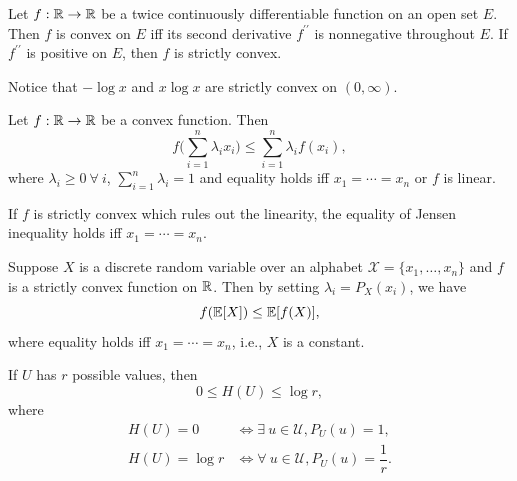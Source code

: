 \documentclass[11pt,a4paper]{article}
\begin{document}
\begin{lemma}
    Let $f:\mathbb{R}\rightarrow \mathbb{R}$ be a twice continuously differentiable function on an open set $E$. Then $f$ is convex on $E$ iff its second derivative $f^{\prime\prime}$ is nonnegative throughout $E$. If $f^{\prime\prime}$ is positive on $E$, then $f$ is strictly convex.
\end{lemma}

\begin{remark}
    Notice that $-\log x$ and $x\log x$ are strictly convex on $(0,\infty)$.
\end{remark}

\begin{lemma}
    Let $f:\mathbb{R}\rightarrow \mathbb{R}$ be a convex function. Then 
    \begin{equation*}
        f\Big(\sum_{i=1}^n\lambda_i x_i\Big)\le \sum_{i=1}^n\lambda_i f(x_i),
    \end{equation*}
    where $\lambda_i\ge 0\ \forall\ i$, $\sum_{i=1}^n\lambda_i = 1$ and equality holds iff $x_1 = \cdots = x_n$ or $f$ is linear.
\end{lemma}

\begin{remark}
    If $f$ is strictly convex which rules out the linearity, the equality of Jensen inequality holds iff $x_1 = \cdots = x_n$.
\end{remark}

\begin{remark}
    Suppose $X$ is a discrete random variable over an alphabet $\mathcal{X} = \{x_1,\ldots,x_n\}$ and $f$ is a strictly convex function on $\mathbb{R}$. Then by setting $\lambda_i = P_X(x_i)$, we have 
    \begin{equation*}
        f(\mathbb{E}[X])\le \mathbb{E}[f(X)],
    \end{equation*}
    where equality holds iff $x_1 = \cdots = x_n$, i.e., $X$ is a constant.
\end{remark}


\begin{theorem}
    If $U$ has $r$ possible values, then 
    \begin{equation*}
        0 \le H(U)\le \log r,
    \end{equation*}
    where 
    \begin{align*}
        H(U) = 0\quad &\iff \exists\ u\in\mathcal{U}, P_U(u) = 1, \\
        H(U) = \log r &\iff \forall\ u\in\mathcal{U}, P_U(u) = \dfrac{1}{r}.
    \end{align*}
\end{theorem}
\end{document}
